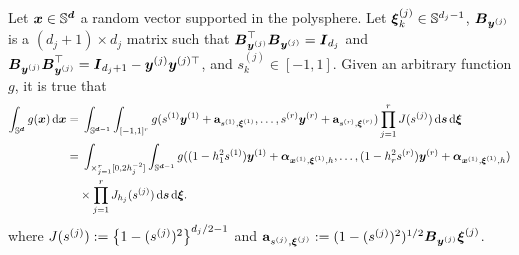 \documentclass[oneside,11pt]{article}
\begin{document}

\begin{lemma}\label{lemma-tnd-poly}
    Let $\boldsymbol{x} \in \mathbb{S}^{\boldsymbol{d}}$ a random vector supported in the polysphere. Let $\boldsymbol\xi_k^{(j)} \in \mathbb{S}^{d_j-1}$, $\boldsymbol{B}_{\boldsymbol{y}^{(j)}}$  is a $(d_j+1) \times d_j$ matrix such that $\boldsymbol{B}_{\boldsymbol{y}^{(j)}}^{\top} \boldsymbol{B}_{\boldsymbol{y}^{(j)}} = \boldsymbol{I}_{d_j}$ and $\boldsymbol{B}_{\boldsymbol{y}^{(j)}} \boldsymbol{B}_{\boldsymbol{y}^{(j)}}^{\top} = \boldsymbol{I}_{d_j+1} - \boldsymbol{y}^{(j)} \boldsymbol{y}^{(j) \top}$, and $s_k^{(j)} \in [-1,1]$. Given an arbitrary function $g$, it is true that
\begin{align}
    \int_{\mathbb{S}^{\boldsymbol{d}}} g(\boldsymbol{x}) \,\mathrm{d} \boldsymbol{x} =&\; \int_{\mathbb{S}^{\boldsymbol{d}-1}} \int_{[-1,1]^r} g(s^{(1)} \boldsymbol{y}^{(1)} + \mathbf{a}_{s^{(1)},\boldsymbol\xi^{(1)}},\ldots, s^{(r)} \boldsymbol{y}^{(r)} + \mathbf{a}_{s^{(r)},\boldsymbol\xi^{(r)}}) \prod_{j=1}^r J(s^{(j)}) \,\mathrm{d} \boldsymbol{s}\,\mathrm{d} \boldsymbol\xi\label{eq:tnpoly} \\
    =&\; \int_{\times_{j=1}^r[0,2h_j^{-2}]} \int_{\mathbb{S}^{\boldsymbol{d}-1}} g((1-h^2_1s^{(1)}) \boldsymbol{y}^{(1)} + \boldsymbol\alpha_{\boldsymbol{x}^{(1)},\boldsymbol\xi^{(1)},h},\ldots, (1-h^2_r s^{(r)}) \boldsymbol{y}^{(r)} + \boldsymbol\alpha_{\boldsymbol{x}^{(1)},\boldsymbol\xi^{(1)},h}) \nonumber\\
    &\times \prod_{j=1}^r J_{h_j}(s^{(j)}) \,\mathrm{d} \boldsymbol{s}\,\mathrm{d} \boldsymbol\xi.\label{eq:tnpoly}
\end{align}
where $J(s^{(j)}) := \left\{1 - (s^{(j)})^2\right\}^{d_j/2 -1}$ and $\mathbf{a}_{s^{(j)},\boldsymbol\xi^{(j)}}:= (1-(s^{(j)})^2)^{1/2} \boldsymbol{B}_{\boldsymbol{y}^{(j)}} \boldsymbol\xi^{(j)}$. 
\end{lemma}
\end{document}

